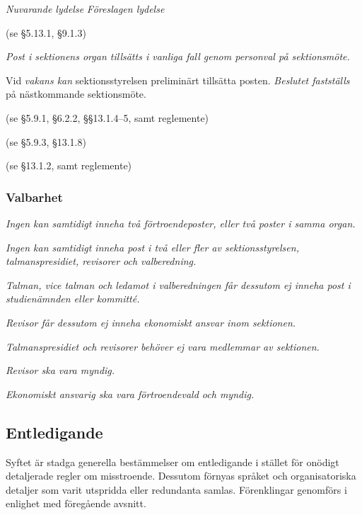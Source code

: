 \documentclass{article}
\newenvironment{lydelse}
    {\begin{paracol}{2}%
        \emph{Nuvarande lydelse}%
        \switchcolumn%
        \emph{Föreslagen lydelse}%
    \end{paracol}%
    \begin{enumerate}[label=\thesubsection.\arabic*]%
    \begin{paracol}{2}%
    }{\end{paracol}\end{enumerate}}
\begin{document}
\begin{lydelse}
    (se \S 5.13.1, \S 9.1.3)
  \switchcolumn
    \item \emph{Post i sektionens organ tillsätts i vanliga fall genom personval på sektionsmöte.} \label{4.x:tillsätt}

    \item Vid \emph{vakans kan} sektionsstyrelsen preliminärt tillsätta posten.
    \emph{Beslutet fastställs} på nästkommande sektionsmöte.

  \switchcolumn*
    \item[] (se \S 5.9.1, \S 6.2.2, \S\S 13.1.4--5, samt reglemente)
    \item[] (se \S 5.9.3, \S 13.1.8)
    \item[] (se \S 13.1.2, samt reglemente)
    \switchcolumn  
    \subsubsection*{Valbarhet}
    \item \emph{Ingen kan samtidigt inneha två förtroendeposter, eller två poster i samma organ.}

    \item \emph{Ingen kan samtidigt inneha post i två eller fler av sektionsstyrelsen, talmanspresidiet, revisorer och valberedning.} \label{4.x:valbar.dubbel}

    \item \emph{Talman, vice talman och ledamot i valberedningen får dessutom ej inneha post i studienämnden eller kommitté.} \label{4.x:valbar.ober}

    \item \emph{Revisor får dessutom ej inneha ekonomiskt ansvar inom sektionen.}
      
    \item \emph{Talmanspresidiet och revisorer behöver ej vara medlemmar av sektionen.}

    \item \emph{Revisor ska vara myndig.} \label{4.x:valbar.revisormyndig}
      
    \item \emph{Ekonomiskt ansvarig ska vara förtroendevald och myndig.}
\end{lydelse}

\subsection{Entledigande}
Syftet är stadga generella bestämmelser om entledigande i stället för onödigt detaljerade regler om misstroende.
Dessutom förnyas språket och organisatoriska detaljer som varit utspridda eller redundanta samlas.
Förenklingar genomförs i enlighet med föregående avsnitt.
\end{document}
